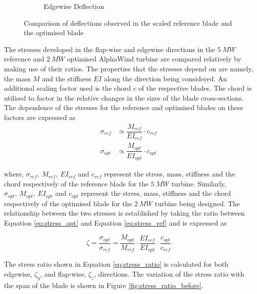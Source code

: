 \begin{figure}[H]
\begin{subfigure}{0.60\textwidth}
\caption{Edgewise Deflection}
\label{fig:deflection_flap_compare}
\end{subfigure}
\caption{Comparison of deflections observed in the scaled reference blade and the optimised blade}
\label{fig:deflection_compare}
\end{figure}

The stresses developed in the flap-wise and edgewise directions in the $5\ MW$ reference and $2\ MW$ optimised AlphaWind turbine are compared relatively by making use of their ratios. The properties that the stresses depend on are namely, the mass $M$ and the stiffness $EI$ along the direction being considered. An additional scaling factor used is the chord $c$ of the respective blades. The chord is utilised to factor in the relative changes in the sizes of the blade cross-sections. The dependence of the stresses for the reference and optimised blades on these factors are expressed as
\begin{align}
    \sigma_{ref} &\propto \dfrac{M_{ref}}{EI_{ref}}\cdot c_{ref} \label{eq:stress_ref} \\
    \sigma_{opt} &\propto \dfrac{M_{opt}}{EI_{opt}}\cdot c_{opt} \label{eq:stress_opt}
\end{align}

where, $\sigma_{ref},\ M_{ref},\ EI_{ref}$ and $c_{ref}$ represent the stress, mass, stiffness and the chord respectively of the reference blade for the  $5\ MW$ turbine. Similarly, $\sigma_{opt},\ M_{opt},\ EI_{opt}$ and $c_{opt}$ represent the stress, mass, stiffness and the chord respectively of the optimised blade for the  $2\ MW$ turbine being designed. The relationship between the two stresses is established by taking the ratio between Equation \ref{eq:stress_opt} and Equation \ref{eq:stress_ref} and is expressed as

\begin{equation}
     \zeta = \dfrac{\sigma_{opt}}{\sigma_{ref}} = \dfrac{M_{opt}}{M_{ref}}\cdot\dfrac{EI_{ref}}{EI_{opt}}\cdot \dfrac{c_{opt}}{c_{ref}}
\label{eq:stress_ratio}
\end{equation}

The stress ratio shown in Equation \ref{eq:stress_ratio} is calculated for both edgewise, $\zeta_y$, and flap-wise, $\zeta_z$, directions. The variation of the stress ratio with the span of the blade is shown in Figure \ref{fig:stress_ratio_before}.

